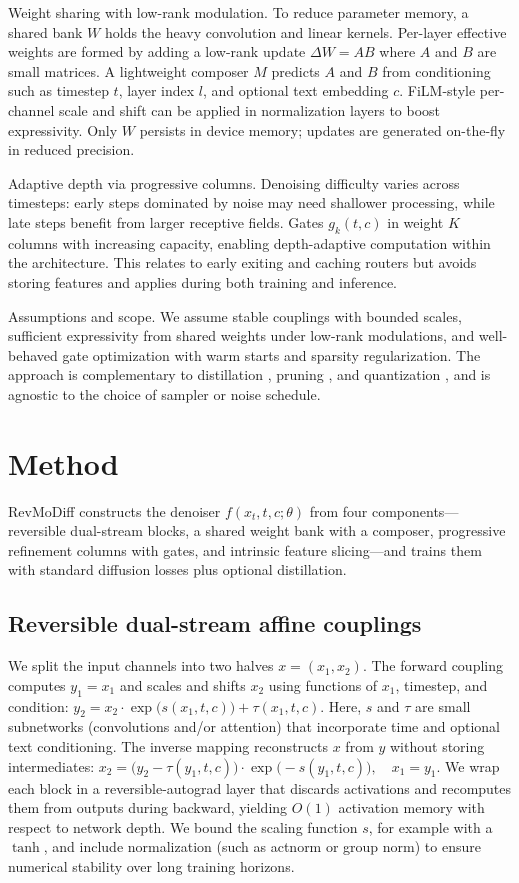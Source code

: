 \documentclass{article}
\begin{document}
Weight sharing with low-rank modulation. To reduce parameter memory, a shared bank $W$ holds the heavy convolution and linear kernels. Per-layer effective weights are formed by adding a low-rank update $\Delta W = A B$ where $A$ and $B$ are small matrices. A lightweight composer $M$ predicts $A$ and $B$ from conditioning such as timestep $t$, layer index $l$, and optional text embedding $c$. FiLM-style per-channel scale and shift can be applied in normalization layers to boost expressivity. Only $W$ persists in device memory; updates are generated on-the-fly in reduced precision.

Adaptive depth via progressive columns. Denoising difficulty varies across timesteps: early steps dominated by noise may need shallower processing, while late steps benefit from larger receptive fields. Gates $g_k(t, c)$ in  weight $K$ columns with increasing capacity, enabling depth-adaptive computation within the architecture. This relates to early exiting \cite{moon-2024-simple} and caching routers \cite{ma-2024-learning} but avoids storing features and applies during both training and inference.

Assumptions and scope. We assume stable couplings with bounded scales, sufficient expressivity from shared weights under low-rank modulations, and well-behaved gate optimization with warm starts and sparsity regularization. The approach is complementary to distillation \cite{salimans-2024-multistep,hsiao-2024-plug}, pruning \cite{fang-2023-structural,zhu-2024-dip}, and quantization \cite{so-2023-temporal}, and is agnostic to the choice of sampler or noise schedule.

\section{Method}
RevMoDiff constructs the denoiser $f(x_t, t, c; \theta)$ from four components—reversible dual-stream blocks, a shared weight bank with a composer, progressive refinement columns with gates, and intrinsic feature slicing—and trains them with standard diffusion losses plus optional distillation.

\subsection{Reversible dual-stream affine couplings}
We split the input channels into two halves $x = (x_1, x_2)$. The forward coupling computes $y_1 = x_1$ and scales and shifts $x_2$ using functions of $x_1$, timestep, and condition:
\(y_2 = x_2 \cdot \exp\big(s(x_1, t, c)\big) + \tau(x_1, t, c).\)
Here, $s$ and $\tau$ are small subnetworks (convolutions and/or attention) that incorporate time and optional text conditioning. The inverse mapping reconstructs $x$ from $y$ without storing intermediates:
\(x_2 = \big(y_2 - \tau(y_1, t, c)\big) \cdot \exp\big(-s(y_1, t, c)\big),\quad x_1 = y_1.\)
We wrap each block in a reversible-autograd layer that discards activations and recomputes them from outputs during backward, yielding $O(1)$ activation memory with respect to network depth. We bound the scaling function $s$, for example with a $\tanh$, and include normalization (such as actnorm or group norm) to ensure numerical stability over long training horizons.
\end{document}
